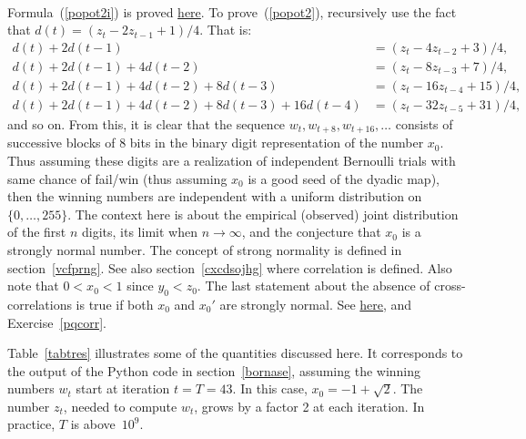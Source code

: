 \documentclass[oneside,10pt]{book}
\newenvironment{proof}[1][Proof]{\begin{trivlist}
\item[\hskip \labelsep {\bfseries #1}]}{\end{trivlist}}
\newcommand{\qed}{\nobreak \ifvmode \relax \else
      \ifdim\lastskip<1.5em \hskip-\lastskip
      \hskip1.5em plus0em minus0.5em \fi \nobreak
      \vrule height0.75em width0.5em depth0.25em\fi}
\begin{document}
\begin{proof}
\quad \\
Formula~(\ref{popot2i}) is proved \href{https://math.stackexchange.com/questions/3537637/limit-associated-with-a-recursion-connection-to-normality-of-quadratic-irration/3553816}{here}. To prove~(\ref{popot2}), recursively use the fact
 that $d(t) = (z_t - 2z_{t-1} + 1)/4$. That is:
\begin{align}
d(t) + 2 d(t-1) & = (z_t - 4z_{t-2} + 3)/4, \nonumber \\
d(t) + 2 d(t-1) + 4d(t-2) & = (z_t - 8z_{t-3} + 7)/4,  \nonumber \\
d(t) + 2 d(t-1) + 4d(t-2) + 8d(t-3) & = (z_t - 16z_{t-4} + 15)/4, \nonumber \\
d(t) + 2 d(t-1) + 4d(t-2) + 8d(t-3) + 16d(t-4) & = (z_t - 32z_{t-5} + 31)/4, \nonumber
\end{align}
and so on. From this, it is clear that the sequence $w_t, w_{t+8},w_{t+16},\dots$  consists of successive blocks of 8 bits in the binary digit representation of the
 number $x_0$. Thus assuming these digits are a realization of independent Bernoulli trials with same chance of fail/win (thus
 assuming $x_0$ is a \textcolor{index}{good seed} of the
\textcolor{index}{dyadic map}),
 then the winning numbers are independent with a uniform distribution on $\{0,\dots,255\}$. The context here is about the empirical (observed) joint distribution of the first $n$ digits, its limit when $n\rightarrow\infty$,  and the conjecture that $x_0$ is a  \textcolor{index}{strongly normal} number. The concept of strong normality is defined in section~\ref{vcfprng}. See also section~\ref{cxcdsojhg} where correlation is defined. Also note that $0<x_0<1$ since
$y_0 < z_0$. The last statement about the absence of cross-correlations is true if both $x_0$ and $x_0'$ are strongly normal.
See \href{https://stats.stackexchange.com/questions/450922/cross-correlations-in-digit-distributions}{here}, and
Exercise~\ref{pqcorr}. \qed
\end{proof}\vspace{1ex}

\noindent Table~\ref{tabtres} illustrates some of the quantities discussed here. It corresponds to the output of the Python code
 in section~\ref{bornase}, assuming the winning numbers $w_t$ start at iteration $t = T = 43$. In this case,
 $x_0 = -1 +\sqrt{2}$. The number $z_t$, needed to compute $w_t$, grows by a factor 2 at each iteration.
 In practice, $T$ is above~$10^9$.
\end{document}
